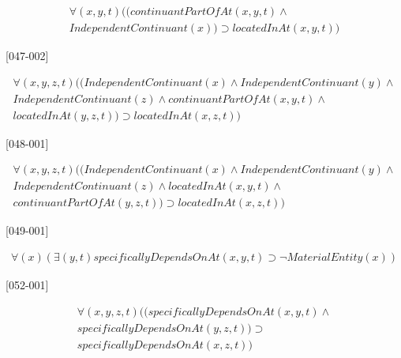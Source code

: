 \documentclass{article}
\begin{document}
\begin{flushright}
[135-001] 

\begin{equation}
\begin{split}
{\forall}(x, y, t)((continuantPartOfAt(x, y, t) \wedge \\
IndependentContinuant(x)) \supset locatedInAt(x, y, t))
\end{split}
\end{equation}

[047-002] 

\begin{equation}
\begin{split}
{\forall}(x, y, z, t)((IndependentContinuant(x) \wedge IndependentContinuant(y) \wedge \\
IndependentContinuant(z) \wedge continuantPartOfAt(x, y, t) \wedge \\
 locatedInAt(y, z, t)) \supset locatedInAt(x, z, t))
\end{split}
\end{equation}

[048-001] 

\begin{equation}
\begin{split}
{\forall}(x, y, z, t)((IndependentContinuant(x) \wedge IndependentContinuant(y) \wedge \\
IndependentContinuant(z) \wedge locatedInAt(x, y, t) \wedge \\
continuantPartOfAt(y, z, t)) \supset locatedInAt(x, z, t))
\end{split}
\end{equation}

[049-001] 

\begin{equation}
\begin{split}
{\forall}(x)({\exists}(y, t)specificallyDependsOnAt(x, y, t) \supset {\neg}MaterialEntity(x))
\end{split}
\end{equation}

[052-001] 

\begin{equation}
\begin{split}
{\forall}(x, y, z, t)((specificallyDependsOnAt(x, y, t) \wedge \\
specificallyDependsOnAt(y, z, t)) \supset \\
specificallyDependsOnAt(x, z, t))
\end{split}
\end{equation}


\end{flushright}
\end{document}
